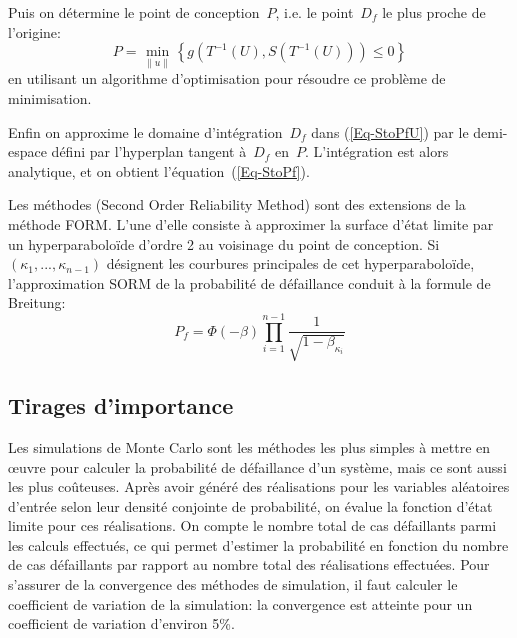 Puis on détermine le point de conception~$P$, i.e. le point~$D_f$ le plus proche de l'origine:
\begin{equation}
P = \min_{\|u\|} \left\{g(T^{-1}(U),S(T^{-1}(U)))\le0\right\}
\end{equation}
en utilisant un algorithme d'optimisation pour résoudre ce problème de minimisation.

Enfin on approxime le domaine d'intégration~$D_f$ dans (\ref{Eq-StoPfU}) par le demi-espace défini par l'hyperplan tangent à~$D_f$ en~$P$. L'intégration est alors analytique, et on obtient l'équation~(\ref{Eq-StoPf}).

\medskip
Les méthodes  (Second Order Reliability Method) sont des extensions de la méthode FORM. 
L'une d'elle consiste à approximer la surface d'état limite par un hyperparaboloïde d'ordre 2 au voisinage du point de conception. Si~$(\kappa_1, ..., \kappa_{n-1})$ désignent les courbures principales de cet hyperparaboloïde, l'approximation SORM de la probabilité de défaillance conduit à la formule de Breitung:
\begin{equation}
P_f = \Phi(-\beta)\prod_{i=1}^{n-1}\dfrac1{\sqrt{1-\beta_{\kappa_i}}}
\end{equation}

\medskip
\subsection{Tirages d'importance}

Les simulations de Monte Carlo sont les méthodes les plus simples à mettre en œuvre pour calculer la probabilité de défaillance d'un système, mais ce sont aussi les plus coûteuses. Après avoir généré des réalisations pour les variables aléatoires d'entrée selon leur densité conjointe de probabilité, on évalue la fonction d'état limite pour ces réalisations. On compte le nombre total de cas défaillants parmi les calculs effectués, ce qui permet d'estimer la probabilité en fonction du nombre de cas défaillants par rapport au nombre total des réalisations effectuées. Pour s'assurer de la convergence des méthodes de simulation, il faut calculer le coefficient de variation de la simulation: la convergence est atteinte pour un coefficient de variation d'environ 5\%.

